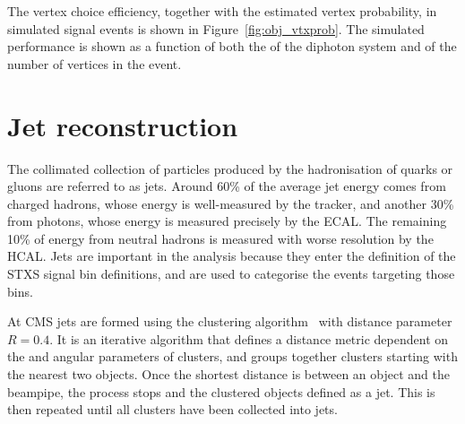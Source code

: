 The vertex choice efficiency, together with the estimated vertex probability,
in simulated \Hgg signal events is shown in Figure~\ref{fig:obj_vtxprob}.
The simulated performance is shown as a function of both the \pt of the diphoton
system and of the number of vertices in the event.

\section{Jet reconstruction}

The collimated collection of particles produced by the hadronisation of quarks or gluons are referred to as jets.
Around 60\% of the average jet energy comes from charged hadrons, whose energy is well-measured by the tracker,
and another 30\% from photons, whose energy is measured precisely by the ECAL.
The remaining 10\% of energy from neutral hadrons is measured with worse resolution by the HCAL.
Jets are important in the \Hgg analysis because they enter the definition of the STXS signal bin definitions, 
and are used to categorise the events targeting those bins.

At CMS jets are formed using the \akt clustering algorithm~\cite{AntiKt} with distance parameter $R=0.4$. %
It is an iterative algorithm that defines a distance metric dependent on the \pt and angular parameters of clusters, 
and groups together clusters starting with the nearest two objects.
Once the shortest distance is between an object and the beampipe, the process stops and the clustered objects defined as a jet.
This is then repeated until all clusters have been collected into jets.

